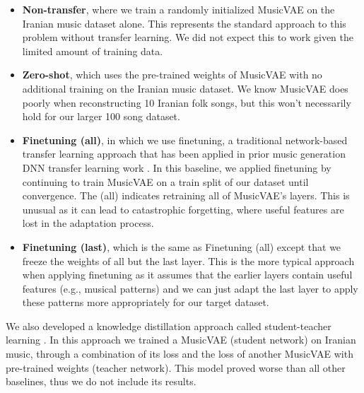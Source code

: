 \documentclass[letterpaper]{article}
\begin{document}
\begin{itemize}
    \item \textbf{Non-transfer}, where we train a randomly initialized MusicVAE on the Iranian music dataset alone. This represents the standard approach to this problem without transfer learning. We did not expect this to work given the limited amount of training data.
    \item \textbf{Zero-shot}, which uses the pre-trained weights of MusicVAE with no additional training on the Iranian music dataset. We know MusicVAE does poorly when reconstructing 10 Iranian folk songs, but this won't necessarily hold for our larger 100 song dataset.
    \item \textbf{Finetuning (all)}, in which we use finetuning, a traditional network-based transfer learning approach that has been applied in prior music generation DNN transfer learning work \cite{tan2018survey,svegliato2016deep,marchetti2021convolutional}. In this baseline, we applied finetuning by continuing to train MusicVAE on a train split of our dataset until convergence. The (all) indicates retraining all of MusicVAE's layers. This is unusual as it can lead to catastrophic forgetting, where useful features are lost in the adaptation process.
    \item \textbf{Finetuning (last)}, which is the same as Finetuning (all) except that we freeze the weights of all but the last layer. This is the more typical approach when applying finetuning as it assumes that the earlier layers contain useful features (e.g., musical patterns) and we can just adapt the last layer to apply these patterns more appropriately for our target dataset.
\end{itemize}

We also developed a knowledge distillation approach called student-teacher learning \cite{student-teacher}. In this approach we trained a MusicVAE (student network) on Iranian music, through a combination of its loss and the loss of another MusicVAE with pre-trained weights (teacher network). This model proved worse than all other baselines, thus we do not include its results.

\end{document}
